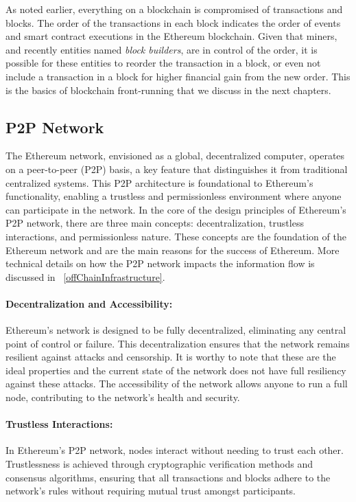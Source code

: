As noted earlier, everything on a blockchain is compromised of transactions and blocks. The order of the transactions in each block indicates the order of events and smart contract executions in the Ethereum blockchain. Given that miners, and recently entities named \textit{block builders}, are in control of the order, it is possible for these entities to reorder the transaction in a block, or even not include a transaction in a block for higher financial gain from the new order. This is the basics of blockchain front-running that we discuss in the next chapters. 


\subsection{P2P Network}

The Ethereum network, envisioned as a global, decentralized computer, operates on a peer-to-peer (P2P) basis, a key feature that distinguishes it from traditional centralized systems. This P2P architecture is foundational to Ethereum's functionality, enabling a trustless and permissionless environment where anyone can participate in the network. In the core of the design principles of Ethereum's P2P network, there are three main concepts: decentralization, trustless interactions, and permissionless nature. These concepts are the foundation of the Ethereum network and are the main reasons for the success of Ethereum. More technical details on how the P2P network impacts the information flow is discussed in ~\ref{offChainInfrastructure}.

\paragraph{Decentralization and Accessibility:} Ethereum's network is designed to be fully decentralized, eliminating any central point of control or failure. This decentralization ensures that the network remains resilient against attacks and censorship. It is worthy to note that these are the ideal properties and the current state of the network does not have full resiliency against these attacks. The accessibility of the network allows anyone to run a full node, contributing to the network's health and security.

\paragraph{Trustless Interactions:} In Ethereum's P2P network, nodes interact without needing to trust each other. Trustlessness is achieved through cryptographic verification methods and consensus algorithms, ensuring that all transactions and blocks adhere to the network's rules without requiring mutual trust amongst participants.

